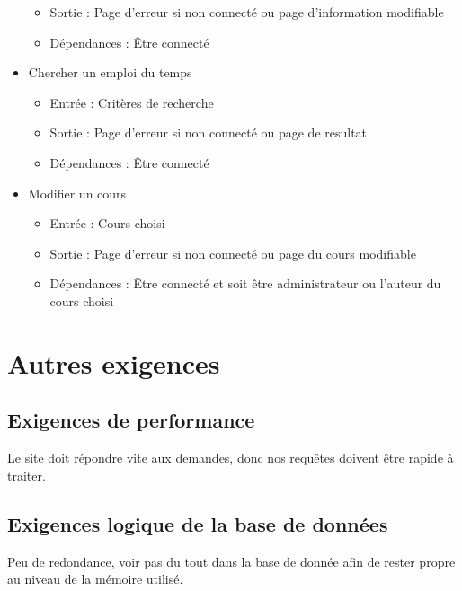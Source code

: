 \documentclass[a4paper, 11pt]{article}
\begin{document}
\begin{itemize}
\begin{itemize}
			\item Sortie : Page d'erreur si non connecté ou page d'information modifiable
			\item Dépendances : Être connecté
		\end{itemize}
		\item Chercher un emploi du temps
		\begin{itemize}
			\item Entrée : Critères de recherche
			\item Sortie : Page d'erreur si non connecté ou page de resultat
			\item Dépendances : Être connecté
		\end{itemize}
		\item Modifier un cours
		\begin{itemize}
			\item Entrée : Cours choisi
			\item Sortie : Page d'erreur si non connecté ou page du cours modifiable
			\item Dépendances : Être connecté et soit être administrateur ou l'auteur du cours choisi
		\end{itemize}
	\end{itemize}
        \section{ Autres exigences}
        \subsection{Exigences de performance}
        Le site doit répondre vite aux demandes, donc nos requêtes doivent être rapide à traiter.
        \subsection{ Exigences logique de la base de données}
        Peu de redondance, voir pas du tout dans la base de donnée afin de rester propre au niveau de la mémoire utilisé.
\end{document}
